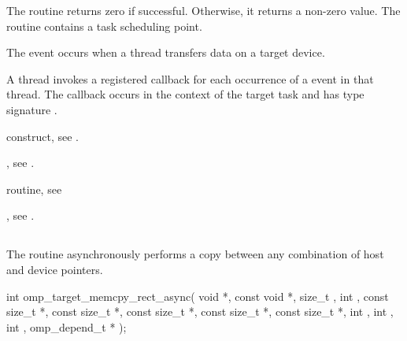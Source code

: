 The routine returns zero if successful.
Otherwise, it returns a non-zero value. The
routine contains a task scheduling point.

\events
The  event occurs when a thread transfers data on a target device.

\tools
A thread invokes a registered 
callback for each occurrence of a  event in that
thread. The callback occurs in the context of the target task and has
type signature .

\begin{crossrefs}
\item {} construct, see .

\item {}, see .

\item {} routine, see

\item {}, see
.

\end{crossrefs}


\subsection{}
\label{subsec:omp_target_cwmemcpy_rect_async}
\summary
The  routine asynchronously performs a copy between any combination of host and device pointers.

\format
\begin{samepage}
\begin{ompcFunction}
int omp_target_memcpy_rect_async(
  void *,
  const void *,
  size_t ,
  int ,
  const size_t *,
  const size_t *,
  const size_t *,
  const size_t *,
  const size_t *,
  int ,
  int ,
  int ,
  omp_depend_t *
);
\end{ompcFunction}
\end{samepage}

